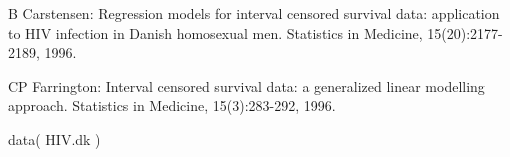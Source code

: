 \begin{References}\relax
B Carstensen: Regression models for interval censored
survival data: application to HIV infection in Danish homosexual
men. Statistics in Medicine, 15(20):2177-2189, 1996.

CP Farrington: Interval censored survival data: a generalized linear
modelling approach. Statistics in Medicine, 15(3):283-292, 1996.
\end{References}
\begin{SeeAlso}\relax
{}
\end{SeeAlso}
\begin{Examples}
\begin{ExampleCode}
  data( HIV.dk ) 
  \end{ExampleCode}
\end{Examples}

